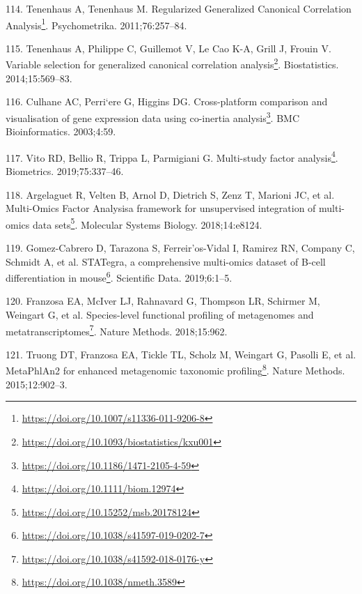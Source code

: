 \documentclass[
  12pt,
  a4paper,
  twoside,
  openright]{book}
\DeclareRobustCommand{\href}[2]{#2\footnote{\url{#1}}}
\newlength{\cslhangindent}
\newlength{\cslentryspacingunit} %
\newenvironment{CSLReferences}[2] %
 {%
  \setlength{\parindent}{0pt}
  \ifodd #1
  \let\oldpar\par
  \def\par{\hangindent=\cslhangindent\oldpar}
  \fi
  \setlength{\parskip}{#2\cslentryspacingunit}
 }%
 {}
\begin{document}
\begin{CSLReferences}{0}{0}
\leavevmode{}%
114. Tenenhaus A, Tenenhaus M. \href{https://doi.org/10.1007/s11336-011-9206-8}{Regularized {Generalized Canonical Correlation Analysis}}. Psychometrika. 2011;76:257--84.

\leavevmode{}%
115. Tenenhaus A, Philippe C, Guillemot V, Le Cao K-A, Grill J, Frouin V. \href{https://doi.org/10.1093/biostatistics/kxu001}{Variable selection for generalized canonical correlation analysis}. Biostatistics. 2014;15:569--83.

\leavevmode{}%
116. Culhane AC, Perri`ere G, Higgins DG. \href{https://doi.org/10.1186/1471-2105-4-59}{Cross-platform comparison and visualisation of gene expression data using co-inertia analysis}. BMC Bioinformatics. 2003;4:59.

\leavevmode{}%
117. Vito RD, Bellio R, Trippa L, Parmigiani G. \href{https://doi.org/10.1111/biom.12974}{Multi-study factor analysis}. Biometrics. 2019;75:337--46.

\leavevmode{}%
118. Argelaguet R, Velten B, Arnol D, Dietrich S, Zenz T, Marioni JC, et al. \href{https://doi.org/10.15252/msb.20178124}{Multi-{Omics Factor Analysis}\textemdash{}a framework for unsupervised integration of multi-omics data sets}. Molecular Systems Biology. 2018;14:e8124.

\leavevmode{}%
119. Gomez-Cabrero D, Tarazona S, Ferreir'os-Vidal I, Ramirez RN, Company C, Schmidt A, et al. \href{https://doi.org/10.1038/s41597-019-0202-7}{{STATegra}, a comprehensive multi-omics dataset of {B}-cell differentiation in mouse}. Scientific Data. 2019;6:1--5.

\leavevmode{}%
120. Franzosa EA, McIver LJ, Rahnavard G, Thompson LR, Schirmer M, Weingart G, et al. \href{https://doi.org/10.1038/s41592-018-0176-y}{Species-level functional profiling of metagenomes and metatranscriptomes}. Nature Methods. 2018;15:962.

\leavevmode{}%
121. Truong DT, Franzosa EA, Tickle TL, Scholz M, Weingart G, Pasolli E, et al. \href{https://doi.org/10.1038/nmeth.3589}{MetaPhlAn2 for enhanced metagenomic taxonomic profiling}. Nature Methods. 2015;12:902--3.


\end{CSLReferences}
\end{document}
